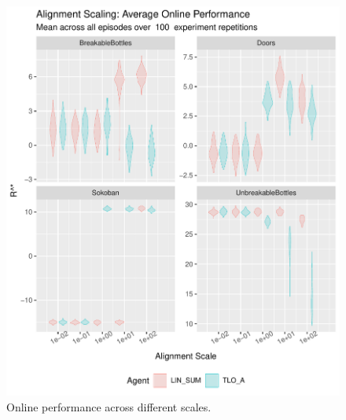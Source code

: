 \begin{figure}
  \includegraphics[width=\columnwidth]{output/multirun_n100_reward_to_util_transformonline_4agents_Alignment.pdf}
  \caption{Online performance across different scales. 
  }
   \label{fig:online_performance_exp2}
 \end{figure}